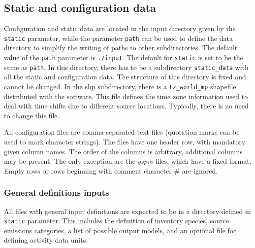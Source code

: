 \documentclass[a4paper,11pt]{article}
\begin{document}
\subsection{Static and configuration data}\label{static-data}
Configuration and static data are located in the input directory given by the \verb|static| parameter, while the parameter \verb|path| can be used to define the data directory to simplify the writing of paths to other subdirectories. The default value of the \verb|path| parameter is \verb|./input|. The default for \verb|static| is set to be the same as \verb|path|. In this directory, there has to be a subdirectory \verb|static_data| with all the static and configuration data. The structure of this directory is fixed and cannot be changed. 
In the shp subdirectory, there is a \verb|tz_world_mp| shapefile distributed with the software. This file defines the time zone information used to deal with time shifts due to different source locations. Typically, there is no need to change this file. 

All configuration files are comma-separated text files (quotation marks can be used to mark character strings). The files have one header row, with mandatory given column names. The order of the columns is arbitrary, additional columns may be present. The only exception are the {\em gspro} files, which have a fixed format. Empty rows or rows beginning with comment character \# are ignored. 

\subsubsection{General definitions inputs}\label{general-definition-inputs}
All files with general input definitions are expected to be in a directory
defined in \verb|static| parameter. This includes the definition of inventory species, source emissions categories, a list of possible output models, and an optional file for defining activity data units.
\end{document}
